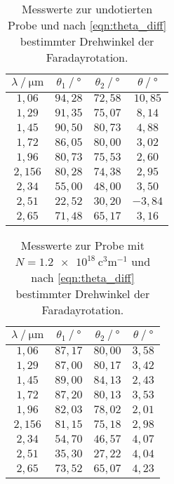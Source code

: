 \begin{table}
  \centering
  \caption{Messwerte zur undotierten Probe und nach \autoref{eqn:theta_diff} bestimmter Drehwinkel der Faradayrotation.}
  \label{tab:mw1}
  \begin{tabular}{c c c c}
    \toprule
    $\lambda \mathbin{/} \unit{\micro\meter}$ & $\theta_{1} \mathbin{/} \unit{\degree}$ & $\theta_{2} \mathbin{/} \unit{\degree}$ &%
     $\theta \mathbin{/} \unit{\degree}$ \\
    \midrule
    $1,06 $ & $94,28$ & $72,58$ & $10,85$ \\
    $1,29 $ & $91,35$ & $75,07$ & $ 8,14$ \\
    $1,45 $ & $90,50$ & $80,73$ & $ 4,88$ \\
    $1,72 $ & $86,05$ & $80,00$ & $ 3,02$ \\
    $1,96 $ & $80,73$ & $75,53$ & $ 2,60$ \\
    $2,156$ & $80,28$ & $74,38$ & $ 2,95$ \\
    $2,34 $ & $55,00$ & $48,00$ & $ 3,50$ \\
    $2,51 $ & $22,52$ & $30,20$ & $-3,84$ \\
    $2,65 $ & $71,48$ & $65,17$ & $ 3,16$ \\
    \bottomrule
  \end{tabular}
\end{table}

\begin{table}
  \centering
  \caption{Messwerte zur Probe mit $N = \qty{1.2e18}{\cubic\centi\metre^{-1}}$ und nach \autoref{eqn:theta_diff} bestimmter Drehwinkel der Faradayrotation.}
  \label{tab:mw2}
  \begin{tabular}{c c c c}
    \toprule
    $\lambda \mathbin{/} \unit{\micro\meter}$ & $\theta_{1} \mathbin{/} \unit{\degree}$ & $\theta_{2} \mathbin{/} \unit{\degree}$ &%
     $\theta \mathbin{/} \unit{\degree}$ \\
    \midrule
    $1,06 $ & $87,17$ & $80,00$ & $3,58$ \\
    $1,29 $ & $87,00$ & $80,17$ & $3,42$ \\
    $1,45 $ & $89,00$ & $84,13$ & $2,43$ \\
    $1,72 $ & $87,20$ & $80,13$ & $3,53$ \\
    $1,96 $ & $82,03$ & $78,02$ & $2,01$ \\
    $2,156$ & $81,15$ & $75,18$ & $2,98$ \\
    $2,34 $ & $54,70$ & $46,57$ & $4,07$ \\
    $2,51 $ & $35,30$ & $27,22$ & $4,04$ \\
    $2,65 $ & $73,52$ & $65,07$ & $4,23$ \\
    \bottomrule
  \end{tabular}
\end{table}

